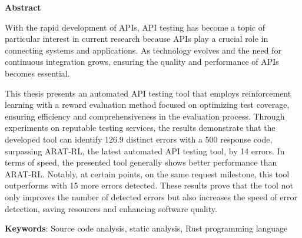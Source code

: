 \begin{center}
\textbf{\large{Abstract}	}
\end{center}

\begin{small}

With the rapid development of APIs, API testing has become a topic of particular interest in current research because APIs play a crucial role in connecting systems and applications. As technology evolves and the need for continuous integration grows, ensuring the quality and performance of APIs becomes essential.

This thesis presents an automated API testing tool that employs reinforcement learning with a reward evaluation method focused on optimizing test coverage, ensuring efficiency and comprehensiveness in the evaluation process. Through experiments on reputable testing services, the results demonstrate that the developed tool can identify 126.9 distinct errors with a 500 response code, surpassing ARAT-RL, the latest automated API testing tool, by 14 errors. In terms of speed, the presented tool generally shows better performance than ARAT-RL. Notably, at certain points, on the same request milestone, this tool outperforms with 15 more errors detected. These results prove that the tool not only improves the number of detected errors but also increases the speed of error detection, saving resources and enhancing software quality.



\vspace*{1cm}
\textbf{Keywords}: Source code analysis, static analysis, Rust programming language
\end{small}
